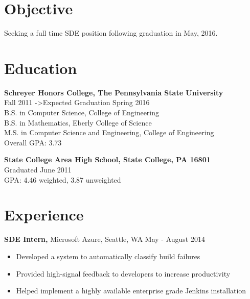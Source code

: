 \documentclass[margin]{res}
\begin{document}
 
\address{{\bf Present Address} \\ 523 Broadway E \\ Apartment 329 \\ Seattle, WA 98102 \\
        (814) 574-8768 }
\address{{\bf Permanent Address} \\ 159 Hemlock Hill Rd \\ State College, PA 16803 \\ douglasjordan0@gmail.com } 
\begin{resume} 
 
\section{Objective} 
Seeking a full time SDE position following graduation in May, 2016.

\section{Education} 
{\bf Schreyer Honors College, The Pennsylvania State University} \\
Fall 2011 -\textgreater Expected Graduation Spring 2016 \\
B.S. in Computer Science, College of Engineering \\
B.S. in Mathematics, Eberly College of Science \\
M.S. in Computer Science and Engineering, College of Engineering \\
Overall GPA: 3.73

{\bf State College Area High School, State College, PA 16801} \\
Graduated June 2011 \\
GPA: 4.46 weighted, 3.87 unweighted

\section{Experience}

{\bf SDE Intern,} Microsoft Azure, Seattle, WA \hfill May - August 2014
\begin{itemize} \itemsep -2pt  %
\item Developed a system to automatically classify build failures
\item Provided high-signal feedback to developers to increase productivity
\item Helped implement a highly available enterprise grade Jenkins installation
\end{itemize}


\end{resume}
\end{document}
